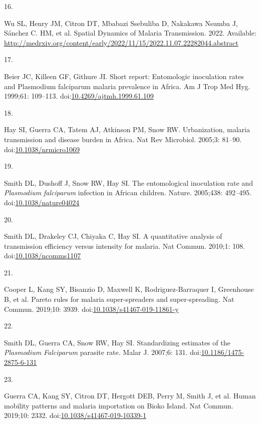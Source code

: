 \documentclass[
]{book}
\newlength{\cslhangindent}
\newlength{\csllabelwidth}
\newlength{\cslentryspacingunit} %
\newenvironment{CSLReferences}[2] %
 {%
  \setlength{\parindent}{0pt}
  \ifodd #1
  \let\oldpar\par
  \def\par{\hangindent=\cslhangindent\oldpar}
  \fi
  \setlength{\parskip}{#2\cslentryspacingunit}
 }%
 {}
\newcommand{\CSLLeftMargin}[1]{\parbox[t]{\csllabelwidth}{#1}}
\newcommand{\CSLRightInline}[1]{\parbox[t]{\linewidth - \csllabelwidth}{#1}\break}
\begin{document}
\begin{CSLReferences}{0}{0}
\leavevmode{}%
\CSLLeftMargin{16. }%
\CSLRightInline{Wu SL, Henry JM, Citron DT, Mbabazi Ssebuliba D, Nakakawa Nsumba J, Sánchez C. HM, et al. Spatial {Dynamics} of {Malaria Transmission}. 2022. Available: \url{http://medrxiv.org/content/early/2022/11/15/2022.11.07.22282044.abstract}}

\leavevmode{}%
\CSLLeftMargin{17. }%
\CSLRightInline{Beier JC, Killeen GF, Githure JI. Short report: Entomologic inoculation rates and {Plasmodium} falciparum malaria prevalence in {Africa}. Am J Trop Med Hyg. 1999;61: 109--113. doi:\href{https://doi.org/10.4269/ajtmh.1999.61.109}{10.4269/ajtmh.1999.61.109}}

\leavevmode{}%
\CSLLeftMargin{18. }%
\CSLRightInline{Hay SI, Guerra CA, Tatem AJ, Atkinson PM, Snow RW. Urbanization, malaria transmission and disease burden in {Africa}. Nat Rev Microbiol. 2005;3: 81--90. doi:\href{https://doi.org/10.1038/nrmicro1069}{10.1038/nrmicro1069}}

\leavevmode{}%
\CSLLeftMargin{19. }%
\CSLRightInline{Smith DL, Dushoff J, Snow RW, Hay SI. The entomological inoculation rate and {\emph{Plasmodium}} {\emph{falciparum}} infection in {African} children. Nature. 2005;438: 492--495. doi:\href{https://doi.org/10.1038/nature04024}{10.1038/nature04024}}

\leavevmode{}%
\CSLLeftMargin{20. }%
\CSLRightInline{Smith DL, Drakeley CJ, Chiyaka C, Hay SI. A quantitative analysis of transmission efficiency versus intensity for malaria. Nat Commun. 2010;1: 108. doi:\href{https://doi.org/10.1038/ncomms1107}{10.1038/ncomms1107}}

\leavevmode{}%
\CSLLeftMargin{21. }%
\CSLRightInline{Cooper L, Kang SY, Bisanzio D, Maxwell K, Rodriguez-Barraquer I, Greenhouse B, et al. Pareto rules for malaria super-spreaders and super-spreading. Nat Commun. 2019;10: 3939. doi:\href{https://doi.org/10.1038/s41467-019-11861-y}{10.1038/s41467-019-11861-y}}

\leavevmode{}%
\CSLLeftMargin{22. }%
\CSLRightInline{Smith DL, Guerra CA, Snow RW, Hay SI. Standardizing estimates of the {\emph{Plasmodium}}{ \emph{Falciparum}} parasite rate. Malar J. 2007;6: 131. doi:\href{https://doi.org/10.1186/1475-2875-6-131}{10.1186/1475-2875-6-131}}

\leavevmode{}%
\CSLLeftMargin{23. }%
\CSLRightInline{Guerra CA, Kang SY, Citron DT, Hergott DEB, Perry M, Smith J, et al. Human mobility patterns and malaria importation on {Bioko Island}. Nat Commun. 2019;10: 2332. doi:\href{https://doi.org/10.1038/s41467-019-10339-1}{10.1038/s41467-019-10339-1}}

\end{CSLReferences}
\end{document}
